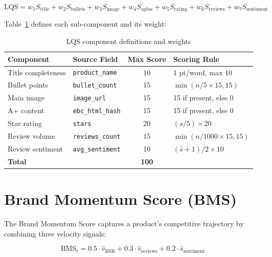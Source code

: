 \begin{equation}
  \text{LQS} = w_1 S_{\text{title}} + w_2 S_{\text{bullets}} + w_3 S_{\text{image}}
             + w_4 S_{\text{aplus}} + w_5 S_{\text{rating}} + w_6 S_{\text{reviews}}
             + w_7 S_{\text{sentiment}}
\end{equation}

Table~\ref{tab:lqs} defines each sub-component and its weight:

\begin{table}[H]
  \centering
  \begin{tabular}{llcp{5cm}}
    \toprule
    \textbf{Component} & \textbf{Source Field} & \textbf{Max Score} & \textbf{Scoring Rule} \\
    \midrule
    Title completeness  & \texttt{product\_name}   & 10 & 1 pt/word, max 10 \\
    Bullet points       & \texttt{bullet\_count}   & 15 & $\min(n/5 \times 15, 15)$ \\
    Main image          & \texttt{image\_url}      & 15 & 15 if present, else 0 \\
    A+ content          & \texttt{ebc\_html\_hash} & 15 & 15 if present, else 0 \\
    Star rating         & \texttt{stars}           & 20 & $(s/5) \times 20$ \\
    Review volume       & \texttt{reviews\_count}  & 15 & $\min(n/1000 \times 15, 15)$ \\
    Review sentiment    & \texttt{avg\_sentiment}  & 10 & $(\hat{s}+1)/2 \times 10$ \\
    \midrule
    \textbf{Total}      &                          & \textbf{100} & \\
    \bottomrule
  \end{tabular}
  \caption{LQS component definitions and weights}
  \label{tab:lqs}
\end{table}

\section{Brand Momentum Score (BMS)}

The Brand Momentum Score captures a product's competitive trajectory by combining
three velocity signals:

\begin{equation}
  \text{BMS}_t = 0.5 \cdot \hat{v}_{\text{BSR}} + 0.3 \cdot \hat{v}_{\text{reviews}}
               + 0.2 \cdot \hat{s}_{\text{sentiment}}
\end{equation}

